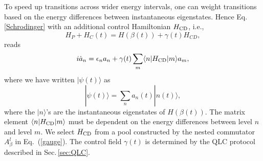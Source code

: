 \documentclass[twocolumn,aps,superscriptaddress,floatfix,longbibliography]{revtex4-2}
\newcommand{\la}{\langle}
\newcommand{\ra}{\rangle}
\newcommand{\Sec}[1]{Sec.\,\ref{#1}}
\newcommand{\Eq}[1]{Eq.\,\eqref{#1}}
\begin{document}





To speed up transitions across wider energy
intervals, one can weight transitions based on the
energy differences between instantaneous eigenstates.
Hence
\Eq{Schrodinger} with an additional control Hamiltonian $H_{\rm CD}$, i.e.,
\begin{equation}
    H_P + H_C(t) = H(\beta(t))+\gamma(t)H_{CD},
\end{equation}
reads
\begin{equation}
i\dot{a}_n=\epsilon_n a_n+ \gamma(t) \sum_m %
    \la n|H_{\rm CD} |m \ra a_m,
    \label{Schrodinger-amp1}
\end{equation}
where we have written $|\psi(t)\rangle$ as
$$
|\psi(t)\rangle = \sum_n a_n(t)|n(t)\rangle,
$$
where the $|n\ra$'s are the instantaneous eigenstates of
$H(\beta(t))$.  The matrix element $\la n|H_{\rm CD} |m \ra$
must be dependent on the energy differences between level $n$
and level $m$. We select $H_{\rm CD}$ from a pool constructed by the nested commutator
$A_{\beta}^{l}$ in Eq.~(\ref{gauge}). 
The control field
$\gamma(t)$ is determined by the QLC protocol described in
\Sec{sec:QLC}. %
\end{document}
